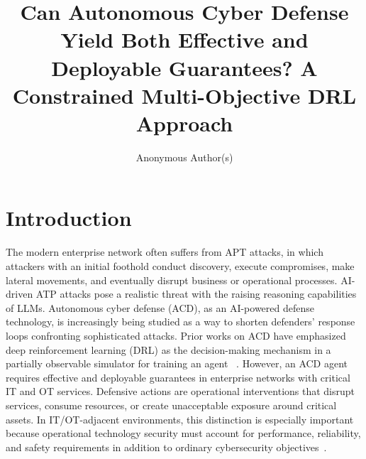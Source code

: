 \documentclass[sigconf,review,anonymous]{acmart}
\title{Can Autonomous Cyber Defense Yield Both Effective and Deployable Guarantees? A Constrained Multi-Objective DRL Approach}
\author{Anonymous Author(s)}
\affiliation{%
  \institution{Anonymous Institution}
  \country{}}
\begin{document}
\maketitle





\section{Introduction}
\label{sec:introduction}

The modern enterprise network often suffers from APT attacks, in which attackers with an initial foothold conduct discovery, execute compromises, make lateral movements, and eventually disrupt business or operational processes.
AI-driven ATP attacks pose a realistic threat with the raising reasoning capabilities of LLMs.
Autonomous cyber defense (ACD), as an AI-powered defense technology, is increasingly being studied as a way to shorten defenders' response loops confronting sophisticated attacks.
Prior works on ACD have emphasized deep reinforcement learning (DRL) as the decision-making mechanism in a partially observable simulator for training an agent ~\cite{vyas2023automated,palmer2023drlsurvey,standen2021cyborg}.
However, an ACD agent requires effective and deployable guarantees in enterprise networks with critical IT and OT services.
Defensive actions are operational interventions that disrupt services, consume resources, or create unacceptable exposure around critical assets.
In IT/OT-adjacent environments, this distinction is especially important because operational technology security must account for performance, reliability, and safety requirements in addition to ordinary cybersecurity objectives~\cite{nist_sp80082r3}.
\end{document}
